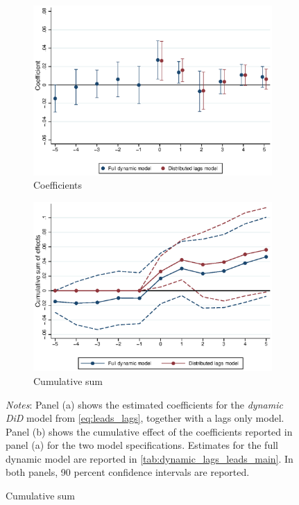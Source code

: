 \begin{figure}[htb!]
    \caption{Results of main dynamic model} %
    \label{fig:fd_models_main}
    \centering
    \begin{subfigure}[b]{0.8\textwidth}
    	\caption{Coefficients}
    	\includegraphics[width = \textwidth]
    	{../../analysis/first_differences/output/fd_models_coeffs_w5.eps}
    \end{subfigure}
    \begin{subfigure}[b]{0.8\textwidth}
    	\caption{Cumulative sum}
    	\includegraphics[width = \textwidth]
    	{../../analysis/first_differences/output/fd_models_cumsum.eps}
    \end{subfigure}
    \begin{minipage}{0.95\textwidth} \footnotesize
		\vspace{2mm} 
		\textit{Notes}: Panel (a) shows the estimated coefficients for the \textit{dynamic DiD} model from 
		 \autoref{eq:leads_lags}, together with a lags only model. Panel (b) shows the cumulative 
		 effect of the coefficients reported in panel (a) for the two model specifications. Estimates
		 for the full dynamic model are reported in \autoref{tab:dynamic_lags_leads_main}. In both panels, 
		 90 percent confidence intervals are reported. 
	\end{minipage}
\end{figure}

